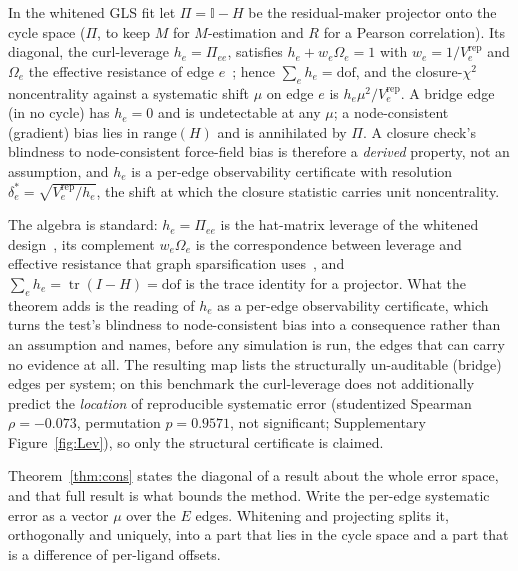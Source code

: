 \begin{theorem}\label{thm:cons}
In the whitened GLS fit let $\Pi=\mathbb{I}-H$ be the residual-maker projector onto the cycle
space ($\Pi$, to keep $M$ for $M$-estimation and $R$ for a
Pearson correlation). Its diagonal, the curl-leverage $h_e=\Pi_{ee}$, satisfies $h_e+w_e\Omega_e=1$ with
$w_e=1/V_e^{\mathrm{rep}}$ and
$\Omega_e$ the effective resistance of edge $e$~\citep{klein1993resistance}; hence
$\sum_e h_e=\mathrm{dof}$, and the closure-$\chi^2$ noncentrality against a systematic shift $\mu$
on edge $e$ is $h_e\mu^2/V_e^{\mathrm{rep}}$. A bridge edge (in no cycle) has $h_e=0$ and is
undetectable at any
$\mu$; a node-consistent (gradient) bias lies in $\mathrm{range}(H)$ and is annihilated by $\Pi$.
A closure check's blindness to node-consistent force-field bias is therefore a \emph{derived}
property, not an assumption, and $h_e$ is a per-edge observability certificate with resolution
$\delta^\ast_e=\sqrt{V_e^{\mathrm{rep}}/h_e}$, the shift at which the closure statistic carries
unit noncentrality.
\end{theorem}
The algebra is standard: $h_e=\Pi_{ee}$ is the hat-matrix leverage of the whitened
design~\citep{hoaglin1978hat}, its complement $w_e\Omega_e$ is the correspondence between leverage
and effective resistance that graph sparsification uses~\citep{spielman2011sparsification}, and
$\sum_e h_e=\operatorname{tr}(I-H)=\mathrm{dof}$ is the trace identity for a projector. What the
theorem adds is the reading of $h_e$ as a per-edge observability certificate, which turns the
test's blindness to node-consistent bias into a consequence rather than an assumption and names,
before any simulation is run, the edges that can carry no evidence at all.
The resulting map lists the structurally un-auditable (bridge) edges per system; on this benchmark the
curl-leverage does not additionally predict the \emph{location} of reproducible systematic error
(studentized Spearman $\rho=-0.073$, permutation $p=0.9571$, not significant; Supplementary
Figure~\ref{fig:Lev}), so only the structural certificate is claimed.

Theorem~\ref{thm:cons} states the diagonal of a result about the whole error space, and that full
result is what bounds the method. Write the per-edge systematic error as a vector $\mu$ over the
$E$ edges. Whitening and projecting splits it, orthogonally and uniquely, into a part that lies in
the cycle space and a part that is a difference of per-ligand offsets.


